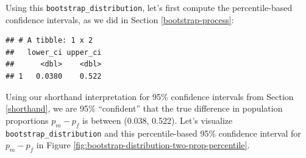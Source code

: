\documentclass[
]{book}
\newenvironment{Shaded}{\begin{snugshade}}{\end{snugshade}}
\newcommand{\CommentTok}[1]{\textcolor[rgb]{0.56,0.35,0.01}{\textit{#1}}}
\newcommand{\DataTypeTok}[1]{\textcolor[rgb]{0.13,0.29,0.53}{#1}}
\newcommand{\DecValTok}[1]{\textcolor[rgb]{0.00,0.00,0.81}{#1}}
\newcommand{\FloatTok}[1]{\textcolor[rgb]{0.00,0.00,0.81}{#1}}
\newcommand{\KeywordTok}[1]{\textcolor[rgb]{0.13,0.29,0.53}{\textbf{#1}}}
\newcommand{\NormalTok}[1]{#1}
\newcommand{\OperatorTok}[1]{\textcolor[rgb]{0.81,0.36,0.00}{\textbf{#1}}}
\newcommand{\StringTok}[1]{\textcolor[rgb]{0.31,0.60,0.02}{#1}}
\begin{document}
\begin{Shaded}
\end{Shaded}

Using this \texttt{bootstrap\_distribution}, let's first compute the percentile-based confidence intervals, as we did in Section \ref{bootstrap-process}:

\begin{Shaded}
\end{Shaded}

\begin{verbatim}
## # A tibble: 1 x 2
##   lower_ci upper_ci
##      <dbl>    <dbl>
## 1   0.0380    0.522
\end{verbatim}

Using our shorthand interpretation for 95\% confidence intervals from Section \ref{shorthand}, we are 95\% ``confident'' that the true difference in population proportions \(p_{m} - p_{f}\) is between (0.038, 0.522). Let's visualize \texttt{bootstrap\_distribution} and this percentile-based 95\% confidence interval for \(p_{m} - p_{f}\) in Figure \ref{fig:bootstrap-distribution-two-prop-percentile}.
\end{document}
